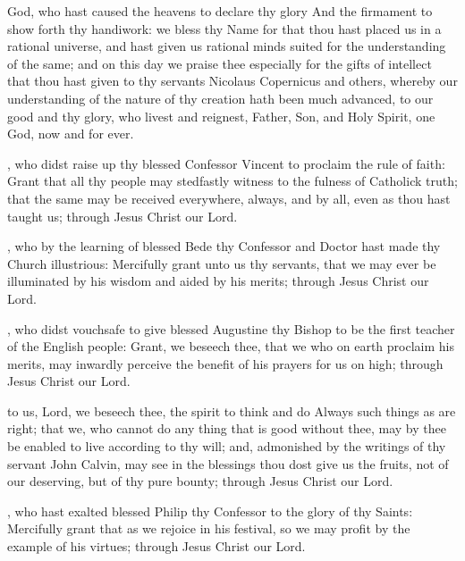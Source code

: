  God, who hast caused the heavens to declare thy glory And the firmament to show forth thy handiwork: we bless thy Name for that thou hast placed us in a rational universe, and hast given us rational minds suited for the understanding of the same; and on this day we praise thee especially for the gifts of intellect that thou hast given to thy servants Nicolaus Copernicus and others, whereby our understanding of the nature of thy creation hath been much advanced, to our good and thy glory, who livest and reignest, Father, Son, and Holy Spirit, one God, now and for ever.

, who didst raise up thy blessed Confessor Vincent to proclaim the rule of faith: Grant that all thy people may stedfastly witness to the fulness of Catholick truth; that the same may be received everywhere, always, and by all, even as thou hast taught us; through Jesus Christ our Lord.

, who by the learning of blessed Bede thy Confessor and Doctor hast made thy Church illustrious: Mercifully grant unto us thy servants, that we may ever be illuminated by his wisdom and aided by his merits; through Jesus Christ our Lord.

, who didst vouchsafe to give blessed Augustine thy Bishop to be the first teacher of the English people: Grant, we beseech thee, that we who on earth proclaim his merits, may inwardly perceive the benefit of his prayers for us on high; through Jesus Christ our Lord.

 to us, Lord, we beseech thee, the spirit to think and do Always such things as are right; that we, who cannot do any thing that is good without thee, may by thee be enabled to live according to thy will; and, admonished by the writings of thy servant John Calvin, may see in the blessings thou dost give us the fruits, not of our deserving, but of thy pure bounty; through Jesus Christ our Lord.

, who hast exalted blessed Philip thy Confessor to the glory of thy Saints: Mercifully grant that as we rejoice in his festival, so we may profit by the example of his virtues; through Jesus Christ our Lord.

